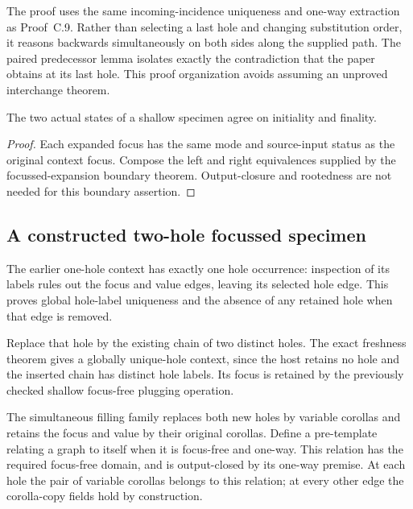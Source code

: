 The proof uses the same incoming-incidence uniqueness and one-way extraction
as Proof~C.9. Rather than selecting a last hole and changing substitution
order, it reasons backwards simultaneously on both sides along the supplied
path. The paired predecessor lemma isolates exactly the contradiction that
the paper obtains at its last hole. This proof organization avoids assuming
an unproved interchange theorem.

\begin{theorem}
The two actual states of a shallow specimen agree on initiality and finality.
\end{theorem}
\begin{proof}
Each expanded focus has the same mode and source-input status as the original
context focus. Compose the left and right equivalences supplied by the
focussed-expansion boundary theorem. Output-closure and rootedness are not
needed for this boundary assertion.
\end{proof}

\subsection{A constructed two-hole focussed specimen}
The earlier one-hole context has exactly one hole occurrence: inspection of
its labels rules out the focus and value edges, leaving its selected hole
edge. This proves global hole-label uniqueness and the absence of any
retained hole when that edge is removed.

Replace that hole by the existing chain of two distinct holes. The exact
freshness theorem gives a globally unique-hole context, since the host
retains no hole and the inserted chain has distinct hole labels. Its focus
is retained by the previously checked shallow focus-free plugging operation.

The simultaneous filling family replaces both new holes by variable corollas
and retains the focus and value by their original corollas. Define a
pre-template relating a graph to itself when it is focus-free and one-way.
This relation has the required focus-free domain, and is output-closed by its
one-way premise. At each hole the pair of variable corollas belongs to this
relation; at every other edge the corolla-copy fields hold by construction.

